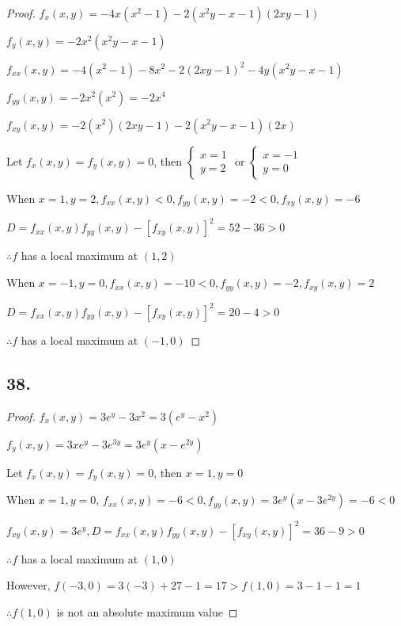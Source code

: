 \documentclass{article}
\begin{document}
  \begin{proof}

    $f_{x}(x, y) = -4x(x^2-1) -2(x^2y-x-1)(2xy-1)$

    $f_{y}(x, y) = -2x^2(x^2y-x-1)$

    $f_{xx}(x, y) = -4(x^2-1) -8x^2 - 2(2xy-1)^2 -4y(x^2y-x-1)$

    $f_{yy}(x, y) = -2x^2(x^2) = -2x^4$

    $f_{xy}(x, y) = -2(x^2)(2xy-1) -2(x^2y-x-1)(2x)$

    Let $f_x(x, y) = f_y(x, y) = 0$, then $\left\{ \begin{array}{ll} x = 1 \\ y = 2 \end{array}\right.$ or $\left\{ \begin{array}{ll} x = -1 \\ y = 0 \end{array}\right.$

    When $x = 1, y = 2, f_{xx}(x, y) < 0, f_{yy}(x, y) = -2 < 0, f_{xy}(x, y) = -6$

    $D = f_{xx}(x, y)f_{yy}(x, y) - [f_{xy}(x, y)]^2 = 52- 36 > 0$

    $\therefore f$ has a local maximum at $(1, 2)$

    When $x = -1, y = 0, f_{xx}(x, y) = -10 < 0, f_{yy}(x, y) = -2, f_{xy}(x, y) = 2$

    $D = f_{xx}(x, y)f_{yy}(x, y) - [f_{xy}(x, y)]^2 = 20 - 4 > 0$

    $\therefore f$ has a local maximum at $(-1, 0)$

  \end{proof}

  \subsection*{38. }

  \begin{proof}
    $f_x(x, y) = 3e^y - 3x^2 = 3(e^y - x^2)$

    $f_y(x, y) = 3xe^y - 3e^{3y} = 3e^y(x-e^{2y})$

    Let $f_x(x, y) = f_y(x, y) = 0$, then $x = 1, y = 0$

    When $x = 1, y = 0$, $f_{xx}(x, y) = -6 < 0,f_{yy}(x, y) = 3e^y(x-3e^{2y}) = -6 < 0$

    $f_{xy}(x, y) = 3e^y, D = f_{xx}(x, y)f_{yy}(x, y) - [f_{xy}(x, y)]^2 = 36 - 9 > 0$

    $\therefore f$ has a local maximum at $(1, 0)$

    However, $f(-3, 0) = 3(-3) + 27 - 1 = 17 > f(1, 0) = 3 - 1 - 1 = 1$

    $\therefore f(1, 0)$ is not an absolute maximum value

  \end{proof}
\end{document}
